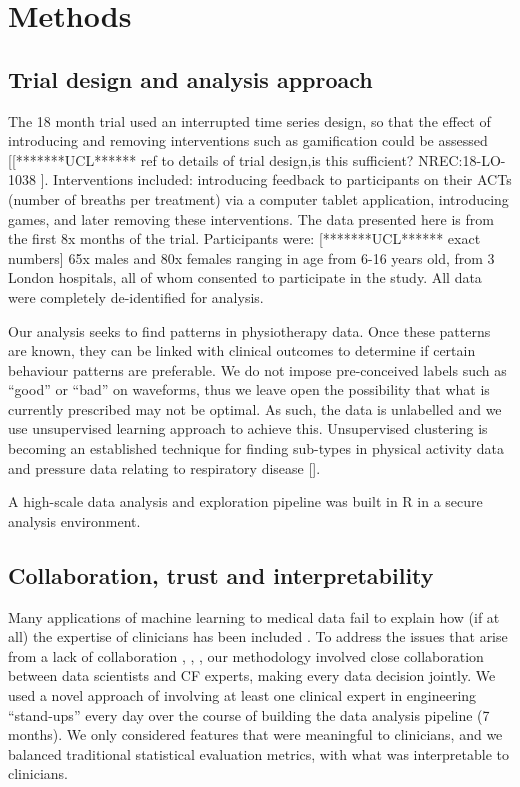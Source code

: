 \documentclass{article}
\begin{document}
\section{Methods}

\subsection{Trial design and analysis approach}

The 18 month trial used an interrupted time series design, so that the effect of introducing and removing interventions such as gamification could be assessed [[*******UCL****** ref to details of trial design,is this sufficient? NREC:18-LO-1038 ]. Interventions included: introducing feedback to participants on their ACTs (number of breaths per treatment) via a computer tablet application, introducing games, and later removing these interventions. The data presented here is from the first 8x months of the trial. Participants were: [*******UCL****** exact numbers] 65x males and 80x females ranging in age from 6-16 years old, from 3 London hospitals, all of whom consented to participate in the study. All data were completely de-identified for analysis. 
 
Our analysis seeks to find patterns in physiotherapy data. Once these patterns are known, they can be linked with clinical outcomes to determine if certain behaviour patterns are preferable. We do not impose pre-conceived labels such as “good” or “bad” on waveforms, thus we leave open the possibility that what is currently prescribed may not be optimal. As such, the data is unlabelled and we use unsupervised learning approach to achieve this. Unsupervised clustering is becoming an established technique for finding sub-types in physical activity data \cite{physical_activity_patterns_2017} and pressure data relating to respiratory disease []. 

A high-scale data analysis and exploration pipeline was built in R in a secure analysis environment.  

\subsection{Collaboration, trust and interpretability}

Many applications of machine learning to medical data fail to explain how (if at all) the expertise of clinicians has been included \cite{Alaa2018}. To address the issues that arise from a lack of collaboration \cite{Vayena2018}, \cite{Challen231}, \cite{Char2018}, \cite{Ahmad2018} our methodology involved close collaboration between data scientists and CF experts, making every data decision jointly. We used a novel approach of involving at least one clinical expert in engineering “stand-ups” every day over the course of building the data analysis pipeline (7 months). We only considered features that were meaningful to clinicians, and we balanced traditional statistical evaluation metrics, with what was interpretable to clinicians.  
\end{document}
